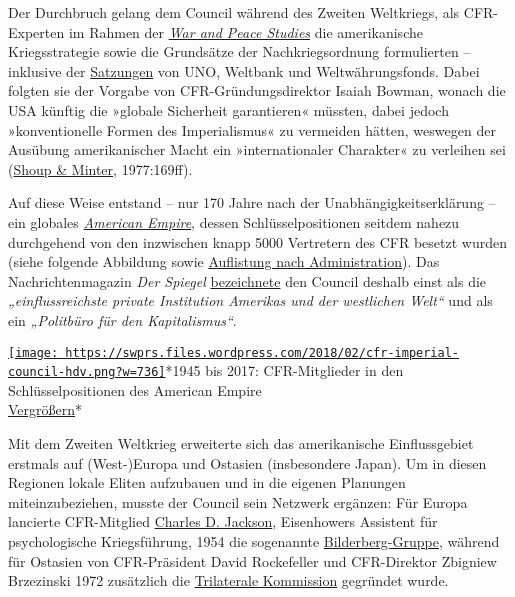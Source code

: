 Der Durchbruch gelang dem Council während des Zweiten Weltkriegs, als
CFR-Experten im Rahmen der
\href{https://swprs.files.wordpress.com/2017/09/cfr_imperial_brain_trust.pdf\#page=129}{\emph{War
and Peace Studies}} die amerikanische Kriegsstrategie sowie die
Grundsätze der Nachkriegsordnung formulierten -- inklusive der
\href{https://swprs.files.wordpress.com/2017/09/domhoff-cfr-2014.pdf}{Satzungen}
von UNO, Weltbank und Weltwährungsfonds. Dabei folgten sie der Vorgabe
von CFR-Gründungs­direktor Isaiah Bowman, wonach die USA künftig die
»globale Sicherheit garantieren« müssten, dabei jedoch »konventionelle
Formen des Imperialismus« zu vermeiden hätten, weswegen der Ausübung
amerikanischer Macht ein »internationaler Charakter« zu verleihen sei
(\href{https://swprs.files.wordpress.com/2017/09/cfr_imperial_brain_trust.pdf\#page=181}{Shoup
\& Minter}, 1977:169ff).

Auf diese Weise entstand -- nur 170 Jahre nach der
Unabhängigkeits­erklärung -- ein globales
\href{http://carnegieendowment.org/1998/06/01/benevolent-empire-pub-275}{\emph{American
Empire}}, dessen Schlüssel­positionen seitdem nahezu durchgehend von den
inzwischen knapp 5000 Vertretern des CFR besetzt wurden (siehe folgende
Abbildung sowie
\href{https://swprs.files.wordpress.com/2017/07/cfr-administration-members-1900-2014.pdf}{Auflistung
nach Administration}). Das Nachrichtenmagazin \emph{Der Spiegel}
\href{http://www.spiegel.de/spiegel/print/d-41389590.html}{bezeichnete}
den Council deshalb einst als die \emph{„einfluss­reichste private
Institution Amerikas und der westlichen Welt``} und als ein
\emph{„Politbüro für den Kapitalismus``}.

\href{https://swprs.files.wordpress.com/2018/02/cfr-imperial-council-hdv.png}{\texttt{[image: https://swprs.files.wordpress.com/2018/02/cfr-imperial-council-hdv.png?w=736]}}*1945
bis 2017: CFR-Mitglieder in den Schlüsselpositionen des American
Empire\\
\href{https://swprs.files.wordpress.com/2018/02/cfr-imperial-council-hdv.png}{Vergrößern}*🔎

Mit dem Zweiten Weltkrieg erweiterte sich das amerikanische
Einflussgebiet erstmals auf (West-)Europa und Ostasien (insbesondere
Japan). Um in diesen Regionen lokale Eliten aufzubauen und in die
eigenen Planungen miteinzubeziehen, musste der Council sein Netzwerk
ergänzen: Für Europa lancierte CFR-Mitglied
\href{https://en.wikipedia.org/wiki/Charles_Douglas_Jackson}{Charles D.
Jackson}, Eisenhowers Assistent für psychologische Kriegsführung, 1954
die sogenannte
\href{https://en.wikipedia.org/wiki/Bilderberg_Group}{Bilderberg-Gruppe},
während für Ostasien von CFR-Präsident David Rockefeller und
CFR-Direktor Zbigniew Brzezinski 1972 zusätzlich die
\href{https://en.wikipedia.org/wiki/Trilateral_Commission}{Trilaterale
Kommission} gegründet wurde.

